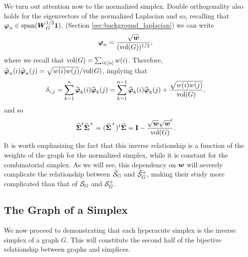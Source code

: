 We turn out attention now to the normalized simplex. Double orthogonality also holds for the eigenvectors of the normalized Laplacian and so, recalling that $\vb*{\varphi}_n \in \textnormal{span}(\vb*{W}_G^{1/2}\vb{1} )$, 
(Section \ref{sec:background_laplacian}) 
we can write 
\[\vb*{\varphi}_n = \frac{\sqrt{\vb*{w}}}{(\textnormal{vol}(G))^{1/2}},\]
where we recall that $\textnormal{vol}(G)=\sum_{i\in[n]} w(i)$. 
Therefore, $\widehat{\vb*{\varphi}}_{n}(i)\widehat{\vb*{\varphi}}_{n}(j)=\sqrt{w(i)w(j)}/\textnormal{vol}(G)$, implying that 
\begin{equation*}\delta_{i,j}=\sum_{k=1}^n \widehat{\vb*{\varphi}}_k(i)\widehat{\vb*{\varphi}}_k(j) = \sum_{k=1}^{n-1} \widehat{\vb*{\varphi}}_k(i)\widehat{\vb*{\varphi}}_k(j) + \frac{\sqrt{w(i)w(j)}}{\textnormal{vol}(G)},
\end{equation*}
and so 
\begin{equation}
\label{eq:svn+svn}
\widehat{\boldsymbol{\Sigma}}^t\widehat{\boldsymbol{\Sigma}}^+=(\widehat{\boldsymbol{\Sigma}}^+)^t\widehat{\boldsymbol{\Sigma}}=\vb{I}-\frac{\sqrt{\vb*{w}}\sqrt{\vb*{w}}^t}{\textnormal{vol}(G)}.
\end{equation}
It is worth emphasizing the fact that this inverse relationship is a function of the weights of the graph for the normalized simplex, while it is constant for the combinatorial simplex. As we will see, this dependency on $\vb*{w}$ will severely complicate the relationship between $\widehat{\mathcal{S}}_G$ and $\widehat{\mathcal{S}}_G^+$, making their study more complicated than that of $\mathcal{S}_G$ and $\mathcal{S}_G^+$. 


\subsection{The Graph of a Simplex}
\label{sec:simplex_to_graph}
We now proceed to demonstrating that  each hyperacute simplex is the inverse simplex of a graph $G$. This will constitute the second half of the bijective relationship between graphs and simplices. 

